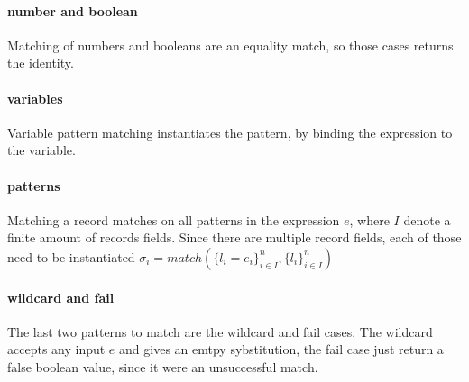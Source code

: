 \documentclass[../../master.tex]{subfiles}
\begin{document}
\paragraph{number and boolean}
Matching of numbers and booleans are an equality match, so those cases returns the identity.

\paragraph{variables}
Variable pattern matching instantiates the pattern, by binding the expression to the variable.

\paragraph{patterns}
Matching a record matches on all patterns in the expression $e$, where $I$ denote a finite amount of records fields.
Since there are multiple record fields, each of those need to be instantiated
$\sigma_i=match(\{l_i=e_i\}^n_{i \in I},\{l_i\}^n_{i \in I})$

\paragraph{wildcard and fail}
The last two patterns to match are the wildcard and fail cases.
The wildcard accepts any input $e$ and gives an emtpy sybstitution, the fail case just return a false boolean value, since it were an unsuccessful match.
\end{document}
